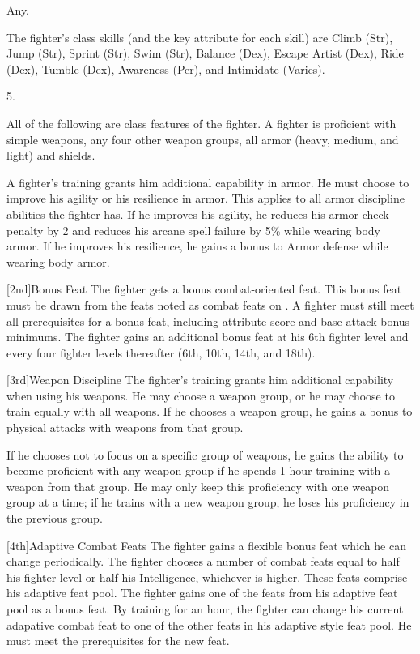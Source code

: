  Any.

The fighter's class skills (and the key attribute for each skill) are Climb (Str), Jump (Str), Sprint (Str), Swim (Str), Balance (Dex), Escape Artist (Dex), Ride (Dex), Tumble (Dex), Awareness (Per), and Intimidate (Varies).

5.

All of the following are class features of the fighter.
 A fighter is proficient with simple weapons, any four other weapon groups,  all armor (heavy, medium, and light) and shields.

A fighter's training grants him additional capability in armor.
He must choose to improve his agility or his resilience in armor.
This applies to all armor discipline abilities the fighter has.
If he improves his agility, he reduces his armor check penalty by 2 and reduces his arcane spell failure by 5\% while wearing body armor.
If he improves his resilience, he gains a  bonus to Armor defense while wearing body armor.

[2nd]{Bonus Feat}
The fighter gets a bonus combat-oriented feat.
This bonus feat must be drawn from the feats noted as combat feats on .
A fighter must still meet all prerequisites for a bonus feat, including attribute score and base attack bonus minimums.
The fighter gains an additional bonus feat at his 6th fighter level and every four fighter levels thereafter (6th, 10th, 14th, and 18th).

[3rd]{Weapon Discipline}
The fighter's training grants him additional capability when using his weapons.
He may choose a weapon group, or he may choose to train equally with all weapons.
If he chooses a weapon group, he gains a  bonus to physical attacks with weapons from that group.

If he chooses not to focus on a specific group of weapons, he gains the ability to become proficient with any weapon group if he spends 1 hour training with a weapon from that group.
He may only keep this proficiency with one weapon group at a time; if he trains with a new weapon group, he loses his proficiency in the previous group.

[4th]{Adaptive Combat Feats}
The fighter gains a flexible bonus feat which he can change periodically.
The fighter chooses a number of combat feats equal to half his fighter level or half his Intelligence, whichever is higher.
These feats comprise his adaptive feat pool.
The fighter gains one of the feats from his adaptive feat pool as a bonus feat.
By training for an hour, the fighter can change his current adapative combat feat to one of the other feats in his adaptive style feat pool.
He must meet the prerequisites for the new feat.

